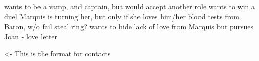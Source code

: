 \documentclass[char]{guildcamp4}
\begin{document}
\name{\cJulie{}}

wants to be a vamp, and captain, but would accept another role
wants to win a duel
Marquis is turning her, but only if she loves him/her
blood tests from Baron, w/o fail
steal ring?
wants to hide lack of love from Marquis
but pursues Joan - love letter

\begin{itemz}[Goals]
	\item 
\end{itemz}

\begin{itemz}[Notes]
	\item 
\end{itemz}

\begin{contacts}
	\contact{\cTest{}} <- This is the format for contacts 
\end{contacts}
\end{document}
